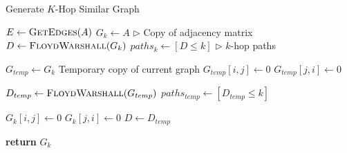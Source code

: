 \begin{algorithm}[H]
\caption{Generate $K$-Hop Similar Graph}
\label{alg:khopbasic}
\begin{algorithmic}[1]

\STATE $E \gets \textsc{GetEdges}(A)$
\STATE $G_{k} \gets A$ \hfill $\triangleright$ Copy of adjacency matrix
\STATE $D \gets \textsc{FloydWarshall}(G_{k})$
\STATE $paths_{k} \gets [D \leq k]$ \hfill $\triangleright$ $k$-hop paths

    \STATE $G_{temp} \gets G_{k}$ \hfill Temporary copy of current graph
    \STATE $G_{temp}[i,j] \gets 0$
    \STATE $G_{temp}[j,i] \gets 0$
    
    \STATE $D_{temp} \gets \textsc{FloydWarshall}(G_{temp})$
    \STATE $paths_{temp} \gets  [D_{temp} \leq k]$
    
        \STATE $G_{k}[i,j] \gets 0$
        \STATE $G_{k}[j,i] \gets 0$
        \STATE $D \gets D_{temp}$
    \ENDIF
    
\ENDFOR

\STATE \textbf{return} $G_{k}$
\end{algorithmic}
\end{algorithm}
